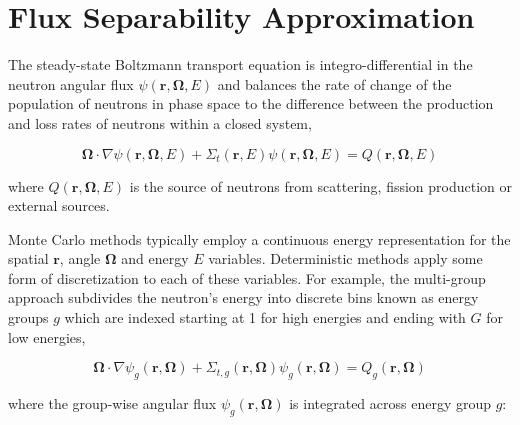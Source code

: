 \section{Flux Separability Approximation}
\label{sec:flux-separability}

The steady-state Boltzmann transport equation is integro-differential in the neutron angular flux $\psi(\mathbf{r},\mathbf{\Omega},E)$ and balances the rate of change of the population of neutrons in phase space to the difference between the production and loss rates of neutrons within a closed system,

\begin{dmath}
\label{eqn:transport-eqn-ce}
\mathbf{\Omega} \cdot \nabla \psi(\mathbf{r},\mathbf{\Omega},E) + \Sigma_{t}(\mathbf{r},E)\psi(\mathbf{r},\mathbf{\Omega},E) = Q(\mathbf{r},\mathbf{\Omega},E)
\end{dmath}


\noindent where $Q(\mathbf{r},\mathbf{\Omega},E)$ is the source of neutrons from scattering, fission production or external sources.

Monte Carlo methods typically employ a continuous energy representation for the spatial $\mathbf{r}$, angle $\mathbf{\Omega}$ and energy $E$ variables. Deterministic methods apply some form of discretization to each of these variables. For example, the multi-group approach subdivides the neutron's energy into discrete bins known as energy groups $g$ which are indexed starting at 1 for high energies and ending with $G$ for low energies,

\begin{dmath}
\label{eqn:transport-eqn-mg}
\mathbf{\Omega} \cdot \nabla \psi_{g}(\mathbf{r},\mathbf{\Omega}) + \Sigma_{t,g}(\mathbf{r},\mathbf{\Omega})\psi_{g}(\mathbf{r},\mathbf{\Omega}) = Q_{g}(\mathbf{r},\mathbf{\Omega})
\end{dmath}

\noindent where the group-wise angular flux $\psi_{g}(\mathbf{r},\mathbf{\Omega})$ is integrated across energy group $g$:


